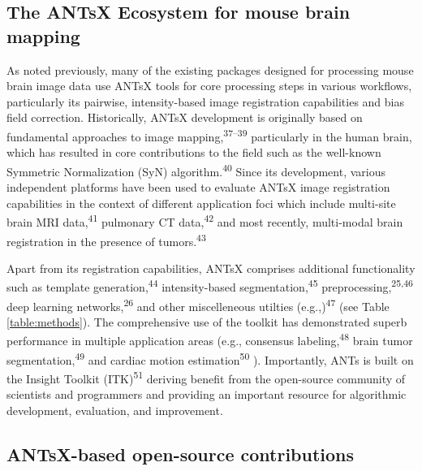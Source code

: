 \documentclass[
  12pt,
]{article}
\begin{document}
\hypertarget{the-antsx-ecosystem-for-mouse-brain-mapping}{%
\subsection{The ANTsX Ecosystem for mouse brain
mapping}\label{the-antsx-ecosystem-for-mouse-brain-mapping}}

As noted previously, many of the existing packages designed for
processing mouse brain image data use ANTsX tools for core processing
steps in various workflows, particularly its pairwise, intensity-based
image registration capabilities and bias field correction. Historically,
ANTsX development is originally based on fundamental approaches to image
mapping,\textsuperscript{37--39} particularly in the human brain, which
has resulted in core contributions to the field such as the well-known
Symmetric Normalization (SyN) algorithm.\textsuperscript{40} Since its
development, various independent platforms have been used to evaluate
ANTsX image registration capabilities in the context of different
application foci which include multi-site brain MRI
data,\textsuperscript{41} pulmonary CT data,\textsuperscript{42} and
most recently, multi-modal brain registration in the presence of
tumors.\textsuperscript{43}



Apart from its registration capabilities, ANTsX comprises additional
functionality such as template generation,\textsuperscript{44}
intensity-based segmentation,\textsuperscript{45}
preprocessing,\textsuperscript{25,46} deep learning
networks,\textsuperscript{26} and other miscelleneous utilties
(e.g.,)\textsuperscript{47} (see Table \ref{table:methods}). The
comprehensive use of the toolkit has demonstrated superb performance in
multiple application areas (e.g., consensus
labeling,\textsuperscript{48} brain tumor
segmentation,\textsuperscript{49} and cardiac motion
estimation\textsuperscript{50} ). Importantly, ANTs is built on the
Insight Toolkit (ITK)\textsuperscript{51} deriving benefit from the
open-source community of scientists and programmers and providing an
important resource for algorithmic development, evaluation, and
improvement.

\hypertarget{antsx-based-open-source-contributions}{%
\subsection{ANTsX-based open-source
contributions}\label{antsx-based-open-source-contributions}}
\end{document}
